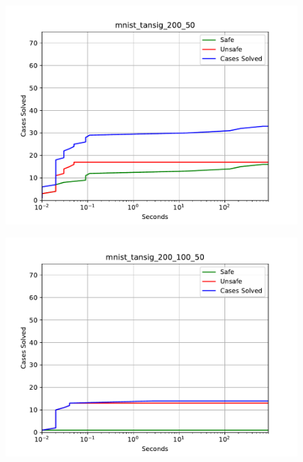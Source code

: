 \begin{figure}[!ht]
\center
\includegraphics[scale=0.8]{figures/mnist_tansig_200_50.pdf}
\end{figure}

\begin{figure}[!ht]
\center
\includegraphics[scale=0.8]{figures/mnist_tansig_200_100_50.pdf}
\end{figure}


















